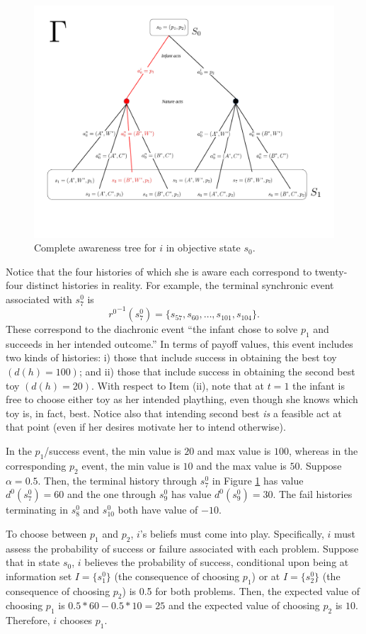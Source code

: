 \documentclass[
11pt,
titlepage,
reqno,
]{article}%
\theoremstyle{definition}
\begin{document}
{\begin{figure}[h!]
	\centering
	\includegraphics*[page=7,trim = 0in .5in 5in 0in,scale=.7]{Awareness_Diagrams_All}
	\caption{Complete awareness tree for $i$ in objective state $s_{0}$.\label{Diag: p-07}}%
\end{figure}

Notice that the four histories of which she is aware each correspond to twenty-four distinct histories in reality.
For example, the terminal synchronic event associated with $s^0_{7}$ is
\[ 
	{r^{0}}^{-1}(s^0_7)=\{s_{57},s_{60},\ldots,s_{101},s_{104}\}.
\]
These correspond to the diachronic event ``the infant chose  to solve $p_1$ and succeeds in her intended outcome.''
In terms of payoff values, this event includes two kinds of histories: i) those that include success in obtaining the best toy $(d(h)=100)$; and ii) those that include success in obtaining the second best toy $(d(h)=20)$.
With respect to Item (ii), note that at $t=1$ the infant is free to choose either toy as her intended plaything, even though she knows which toy is, in fact, best.
Notice also that intending second best \textit{is} a feasible act at that point (even if her desires motivate her to intend otherwise).

In the  $p_1$/success event, the min value is $20$ and max value is $100$, whereas in the corresponding $p_2$ event, the min value is $10$ and the max value is $50$.
Suppose $\alpha=0.5$. 
Then, the terminal history through $s^0_{7}$ in Figure \ref{Diag: p-07} has value $d^{0}(s^0_{7})=60$ and the one through  $s^0_{9}$  has value $d^{0}(s^0_{9})=30$.
The fail histories terminating in $s^0_{8}$ and $s^0_{10}$  both have value of $-10$.


To choose between $p_1$ and $p_2$, $i$'s beliefs must come into play.
Specifically, $i$ must assess the probability of success or failure associated with each problem. 
Suppose that in state $s_0$, $i$  believes the probability of success, conditional upon being at information set $I=\{s^0_1\}$ (the consequence of choosing $p_1$) or at $I=\{s^0_2\}$ (the consequence of choosing $p_2$) is 0.5 for both problems. 
Then, the expected value of choosing $p_1$ is $0.5*60-0.5*10=25$ and the expected value of choosing $p_2$ is $10$.
Therefore, $i$ chooses $p_1$.
}
\end{document}

